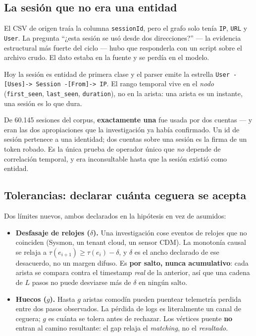 \documentclass[11pt,a4paper]{article}
\newcommand{\code}[1]{\texttt{\small #1}}
\begin{document}
\subsection{La sesión que no era una entidad}
\label{sec:sesiones}

El CSV de origen traía la columna \code{sessionId}, pero el grafo solo tenía
\code{IP}, \code{URL} y \code{User}. La pregunta ``¿esta sesión se usó desde
dos direcciones?'' --- la evidencia estructural más fuerte del ciclo --- hubo
que responderla con un script sobre el archivo crudo. El dato estaba en la
fuente y se perdía en el modelo.

Hoy la sesión es entidad de primera clase y el parser emite la estrella
\code{User -[Uses]-> Session -[From]-> IP}. El rango temporal vive en el
\emph{nodo} (\code{first\_seen}, \code{last\_seen}, \code{duration}), no en la
arista: una arista es un instante, una sesión es lo que dura.

\begin{ideabox}
De 60.145 sesiones del corpus, \textbf{exactamente una} fue usada por dos
cuentas --- y eran las dos apropiaciones que la investigación ya había
confirmado. Un id de sesión pertenece a una identidad; dos cuentas sobre una
sesión es la firma de un token robado. Es la única prueba de operador único que
\emph{no} depende de correlación temporal, y era inconsultable hasta que la
sesión existió como entidad.
\end{ideabox}

\subsection{Tolerancias: declarar cuánta ceguera se acepta}

Dos límites nuevos, ambos declarados en la hipótesis en vez de asumidos:

\begin{itemize}\itemsep2pt
  \item \textbf{Desfasaje de relojes ($\delta$).} Una investigación cose
  eventos de relojes que no coinciden (Sysmon, un tenant cloud, un sensor CDM).
  La monotonía causal se relaja a $\tau(e_{i+1}) \ge \tau(e_i) - \delta$, y
  $\delta$ es el ancho declarado de ese desacuerdo, no un margen difuso. Es
  \textbf{por salto, nunca acumulativo}: cada arista se compara contra el
  timestamp \emph{real} de la anterior, así que una cadena de $L$ pasos no
  puede desviarse más de $\delta$ en ningún salto.
  \item \textbf{Huecos ($g$).} Hasta $g$ aristas comodín pueden puentear
  telemetría perdida entre dos pasos observados. La pérdida de logs es
  literalmente un canal de ceguera; $g$ es cuánta se tolera antes de rechazar.
  Los vértices puente \textbf{no} entran al camino resultante: el gap relaja el
  \emph{matching}, no el \emph{resultado}.
\end{itemize}
\end{document}
